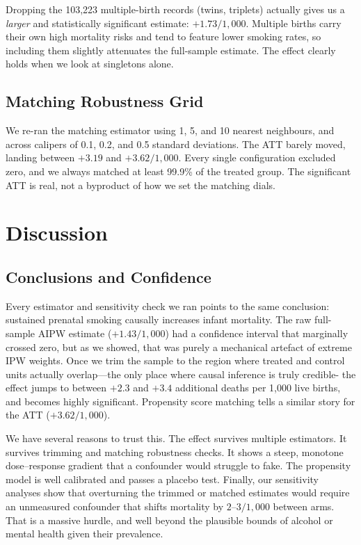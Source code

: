 \documentclass[11pt]{article}
\begin{document}
Dropping the 103,223 multiple-birth records (twins, triplets) actually gives us a
\emph{larger} and statistically significant estimate: $+1.73/1{,}000$. Multiple
births carry their own high mortality risks and tend to feature lower smoking
rates, so including them slightly attenuates the full-sample estimate. The effect
clearly holds when we look at singletons alone.

\subsection{Matching Robustness Grid}

We re-ran the matching estimator using 1, 5, and 10 nearest neighbours, and across
calipers of 0.1, 0.2, and 0.5 standard deviations. The ATT barely moved, landing
between $+3.19$ and $+3.62/1{,}000$. Every single configuration excluded zero, and
we always matched at least 99.9\% of the treated group. The significant ATT is real,
not a byproduct of how we set the matching dials.


\section{Discussion}

\subsection{Conclusions and Confidence}

Every estimator and sensitivity check we ran points to the same conclusion:
sustained prenatal smoking causally increases infant mortality. The raw
full-sample AIPW estimate ($+1.43/1{,}000$) had a confidence interval that
marginally crossed zero, but as we showed, that was purely a mechanical artefact
of extreme IPW weights. Once we trim the sample to the region where treated and
control units actually overlap---the only place where causal inference is truly
credible- the effect jumps to between $+2.3$ and $+3.4$ additional deaths per
1,000 live births, and becomes highly significant. Propensity score matching
tells a similar story for the ATT ($+3.62/1{,}000$).

We have several reasons to trust this. The effect survives multiple estimators.
It survives trimming and matching robustness checks. It shows a steep, monotone
dose--response gradient that a confounder would struggle to fake. The propensity
model is well calibrated and passes a placebo test. Finally, our sensitivity
analyses show that overturning the trimmed or matched estimates would require an
unmeasured confounder that shifts mortality by $2$--$3/1{,}000$ between arms. That
is a massive hurdle, and well beyond the plausible bounds of alcohol or mental
health given their prevalence.
\end{document}
